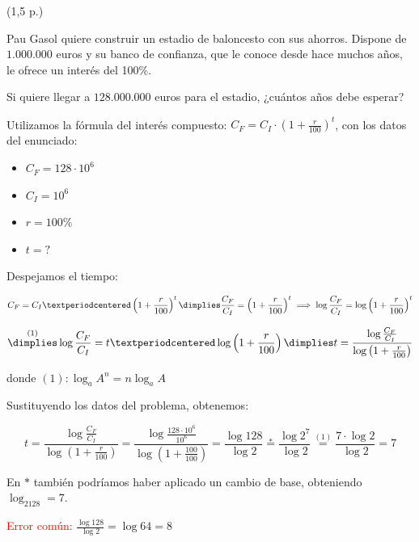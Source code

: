 \documentclass[palatino,nosec]{Docencia}
\begin{document}
\begin{problem} (1,5 p.)

Pau Gasol quiere construir un estadio de baloncesto con sus ahorros. Dispone de $1.000.000$ euros y su banco de confianza, que le conoce desde hace muchos años, le ofrece un interés del 100\%. 

Si quiere llegar a $128.000.000$ euros para el estadio, ¿cuántos años debe esperar?
\solution

Utilizamos la fórmula del interés compuesto: $C_F = C_I·\left(1+\frac{r}{100}\right)^t$, con los datos del enunciado:
\begin{itemize}
	\item $C_F = 128·10^6$
	\item $C_I = 10^6$
	\item $r=100\%$
	\item $t=?$
\end{itemize}

Despejamos el tiempo:

\[
C_F = C_I·\left(1+\frac{r}{100}\right)^t \dimplies \frac{C_F}{C_I} = \left(1+\frac{r}{100}\right)^t \implies \log \frac{C_F}{C_I} = \log \left(1+\frac{r}{100}\right)^t 
\]

\[\overset{(1)}{\dimplies} \log \frac{C_F}{C_I} = t·\log \left(1+\frac{r}{100}\right) \dimplies  t= \frac{\log\frac{C_F}{C_I}}{\log \left(1+\frac{r}{100}\right)}
\]

donde $(1): \log_aA^n = n\log_aA$

Sustituyendo los datos del problema, obtenemos:

\[
  t= \frac{\log\frac{C_F}{C_I}}{\log \left(1+\frac{r}{100}\right)} = \frac{\log{\frac{128·10^6}{10^6}}}{\log\left(1+\frac{100}{100}\right)} = \frac{\log 128}{\log 2} \overset{\ast}{=} \frac{\log 2^7}{\log 2} \overset{(1)}{=} \frac{7·\log2}{\log2} = 7
\]

En $\ast$ también podríamos haber aplicado un cambio de base, obteniendo $\log_2128 = 7$.

\begin{center}
\textcolor{red}{Error común: } $\displaystyle\frac{\log 128}{\log 2} = \log 64 = 8$
\end{center}
\end{problem}
\end{document}
